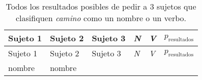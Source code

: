 \documentclass[12pt,spanish,a4paper,]{article}
\begin{document}
\hypertarget{prob}{}

\begin{longtable}[]{@{}llllll@{}}
\caption{Todos los resultados posibles de pedir a 3 sujetos que
clasifiquen \emph{camino} como un nombre o un verbo.}\tabularnewline
\toprule
\begin{minipage}[b]{0.13\columnwidth}\raggedright
Sujeto 1\strut
\end{minipage} & \begin{minipage}[b]{0.13\columnwidth}\raggedright
Sujeto 2\strut
\end{minipage} & \begin{minipage}[b]{0.13\columnwidth}\raggedright
Sujeto 3\strut
\end{minipage} & \begin{minipage}[b]{0.07\columnwidth}\raggedright
\emph{N}\strut
\end{minipage} & \begin{minipage}[b]{0.07\columnwidth}\raggedright
\emph{V}\strut
\end{minipage} & \begin{minipage}[b]{0.32\columnwidth}\raggedright
\(p_{\textrm{resultados}}\)\strut
\end{minipage}\tabularnewline
\midrule
\endfirsthead
\toprule
\begin{minipage}[b]{0.13\columnwidth}\raggedright
Sujeto 1\strut
\end{minipage} & \begin{minipage}[b]{0.13\columnwidth}\raggedright
Sujeto 2\strut
\end{minipage} & \begin{minipage}[b]{0.13\columnwidth}\raggedright
Sujeto 3\strut
\end{minipage} & \begin{minipage}[b]{0.07\columnwidth}\raggedright
\emph{N}\strut
\end{minipage} & \begin{minipage}[b]{0.07\columnwidth}\raggedright
\emph{V}\strut
\end{minipage} & \begin{minipage}[b]{0.32\columnwidth}\raggedright
\(p_{\textrm{resultados}}\)\strut
\end{minipage}\tabularnewline
\midrule
\endhead
\begin{minipage}[t]{0.13\columnwidth}\raggedright
nombre\strut
\end{minipage} & \begin{minipage}[t]{0.13\columnwidth}\raggedright
nombre\strut
\end{minipage} & \begin{minipage}[t]{0.13\columnwidth}\raggedright

\end{minipage}
\end{longtable}
\end{document}
